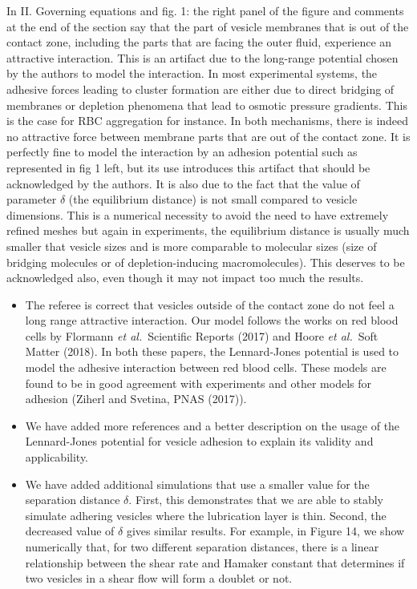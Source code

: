 \documentclass[11pt]{article}
\newcommand{\comment}[1]{{\color{blue} #1}}
\begin{document}
\noindent
\comment{In II. Governing equations and fig. 1: the right panel of the
figure and comments at the end of the section say that the part of
vesicle membranes that is out of the contact zone, including the parts
that are facing the outer fluid, experience an attractive interaction.
This is an artifact due to the long-range potential chosen by the
authors to model the interaction. In most experimental systems, the
adhesive forces leading to cluster formation are either due to direct
bridging of membranes or depletion phenomena that lead to osmotic
pressure gradients. This is the case for RBC aggregation for instance.
In both mechanisms, there is indeed no attractive force between membrane
parts that are out of the contact zone. It is perfectly fine to model
the interaction by an adhesion potential such as represented in fig 1
left, but its use introduces this artifact that should be acknowledged
by the authors. It is also due to the fact that the value of parameter
$\delta$ (the equilibrium distance) is not small compared to vesicle
dimensions. This is a numerical necessity to avoid the need to have
extremely refined meshes but again in experiments, the equilibrium
distance is usually much smaller that vesicle sizes and is more
comparable to molecular sizes (size of bridging molecules or of
depletion-inducing macromolecules). This deserves to be acknowledged
also, even though it may not impact too much the results.}
\begin{itemize}
  \item The referee is correct that vesicles outside of the contact zone
    do not feel a long range attractive interaction.  Our model follows
    the works on red blood cells by Flormann {\em et al.}~Scientific
    Reports (2017) and Hoore {\em et al.}~Soft Matter (2018).  In both
    these papers, the Lennard-Jones potential is used to model the
    adhesive interaction between red blood cells.  These models are
    found to be in good agreement with experiments and other models for
    adhesion (Ziherl and Svetina, PNAS (2017)).

  \item We have added more references and a better description on the
    usage of the Lennard-Jones potential for vesicle adhesion to explain
    its validity and applicability.

  \item We have added additional simulations that use a smaller value
    for the separation distance $\delta$.  First, this demonstrates that
    we are able to stably simulate adhering vesicles where the
    lubrication layer is thin.  Second, the decreased value of $\delta$
    gives similar results.  For example, in Figure 14, we show
    numerically that, for two different separation distances, there is a
    linear relationship between the shear rate and Hamaker constant that
    determines if two vesicles in a shear flow will form a doublet or
    not.
\end{itemize}
\end{document}
